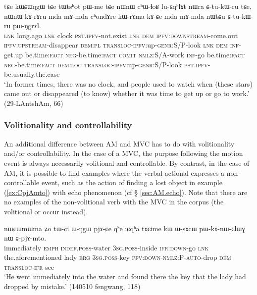  \begin{exe}
\ex \label{ex:kWrAma.kACe}
\gll  tɕe kɯɕɯŋgɯ tɕe tɯtsʰot pɯ-me tɕe  nɯnɯ cʰɯ-ɬoʁ lu-ɕqʰlɤt nɯra ɕ-tu-kɯ-ru tɕe, nɯnɯ kɤ-rɤru mda mɤ-mda cʰondɤre kɯ-rɤma kɤ-ɕe mda mɤ-mda nɯtɕu ɕ-tu-kɯ-ru pɯ-ŋgrɤl. \\
 \textsc{lnk} long.ago \textsc{lnk} clock \textsc{pst}.\textsc{ipfv}-not.exist \textsc{lnk} \textsc{dem} \textsc{ipfv}:\textsc{downstream}-come.out \textsc{ipfv}:\textsc{upstream}-disappear \textsc{dem}:\textsc{pl} \textsc{transloc}-\textsc{ipfv}:up-\textsc{genr}:S/P-look \textsc{lnk} \textsc{dem} \textsc{inf}-get.up be.time:\textsc{fact} \textsc{neg}-be.time:\textsc{fact} \textsc{comit} \textsc{nmlz}:S/A-work \textsc{inf}-go be.time:\textsc{fact} \textsc{neg}-be.time:\textsc{fact} \textsc{dem}:\textsc{loc} \textsc{transloc}-\textsc{ipfv}:up-\textsc{genr}:S/P-look \textsc{pst}.\textsc{ipfv}-be.usually.the.case  \\
 \glt  `In former times, there was no clock, and people used to watch when (these stars) came out or disappeared (to know) whether it was time to get up or go to work.' (29-LAntshAm, 66)
  \end{exe}
  
\subsubsection{Volitionality and controllability}
An additional difference between AM and MVC has to do with volitionality and/or controllability. In the case of a MVC, the purpose following the motion event is always necessarily volitional and controllable. By contrast, in the case of AM, it is possible to find examples where the verbal actional expresses a non-controllable event, such as the action of finding a lost object in example (\ref{ex:CpjAmto}) with echo phenomenon (cf § \ref{sec:AM.echo}). Note that there are no examples of the non-volitional verb  with the MVC in the corpus (the volitional  or  occur  instead). 

\begin{exe}
\ex  \label{ex:CpjAmto}
\gll  nɯɕɯmɯma ʑo tɯ-ci ɯ-ŋgɯ pjɤ-ɕe qʰe iɕqʰa tɤɕime kɯ ɯ-sɤcɯ pɯ-kɤ-nɯ-ɕlɯɣ nɯ ɕ-pjɤ-mto. \\
immediately \textsc{emph} \textsc{indef}.\textsc{poss}-water \textsc{3sg}.\textsc{poss}-inside \textsc{ifr}:\textsc{down}-go \textsc{lnk} the.aforementioned lady \textsc{erg} \textsc{3sg}.\textsc{poss}-key \textsc{pfv}:\textsc{down}-\textsc{nmlz}:P-\textsc{auto}-drop \textsc{dem} \textsc{transloc}-\textsc{ifr}-see \\
\glt `He went immediately into the water and found there the key that the lady had dropped by mistake.' (140510 fengwang, 118)
\end{exe}

